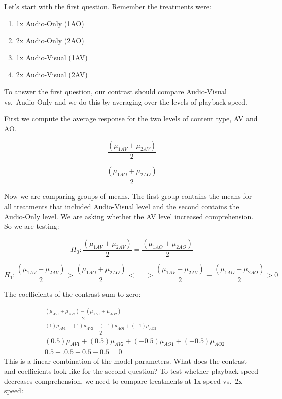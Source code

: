 \documentclass[
  letterpaper,
]{book}
\providecommand{\tightlist}{%
  \setlength{\itemsep}{0pt}\setlength{\parskip}{0pt}}\usepackage{longtable,booktabs,array}
\begin{document}
Let's start with the first question. Remember the treatments were:

\begin{enumerate}
\def\labelenumi{\arabic{enumi}.}
\tightlist
\item
  1x Audio-Only (1AO)
\item
  2x Audio-Only (2AO)
\item
  1x Audio-Visual (1AV)
\item
  2x Audio-Visual (2AV)
\end{enumerate}

To answer the first question, our contrast should compare Audio-Visual
vs.~Audio-Only and we do this by averaging over the levels of playback
speed.

First we compute the average response for the two levels of content
type, AV and AO.

\[\frac{(\mu_{1AV} + \mu_{2AV})}{2}\]

\[\frac{(\mu_{1AO} + \mu_{2AO})}{2}\]

Now we are comparing groups of means. The first group contains the means
for all treatments that included Audio-Visual level and the second
contains the Audio-Only level. We are asking whether the AV level
increased comprehension. So we are testing:


\[H_0: \frac{(\mu_{1AV} + \mu_{2AV})}{2} = \frac{(\mu_{1AO} + \mu_{2AO})}{2}\]

\[
H_1: \frac{(\mu_{1AV} + \mu_{2AV})}{2} > \frac{(\mu_{1AO} + \mu_{2AO})}{2} <=> \frac{(\mu_{1AV} + \mu_{2AV})}{2} - \frac{(\mu_{1AO} + \mu_{2AO})}{2} > 0
\]

The coefficients of the contrast sum to zero:

\[
\begin{aligned}
&\frac{(\mu_{AV1} + \mu_{AV2}) - (\mu_{AO1} + \mu_{AO2})}{2} \\
&\frac{(1) \mu_{AV1} + (1) \mu_{AV2} + (-1) \mu_{AO1} + (-1) \mu_{AO2}}{2} \\ 
& (0.5) \mu_{AV1} + (0.5) \mu_{AV2} + (-0.5) \mu_{AO1} + (-0.5) \mu_{AO2} \\
&0.5+.0.5-0.5-0.5 = 0
\end{aligned}
\] This is a linear combination of the model parameters. What does the
contrast and coefficients look like for the second question? To test
whether playback speed decreases comprehension, we need to compare
treatments at 1x speed vs.~2x speed:
\end{document}

